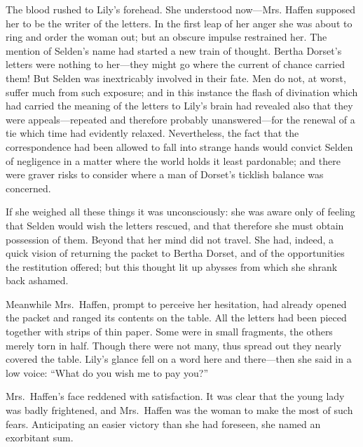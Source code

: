 \documentclass[12pt,a4paper]{book}
\begin{document}
The blood rushed to Lily's forehead. She understood now---Mrs.
Haffen supposed her to be the writer of the letters. In the first
leap of her anger she was about to ring and order the woman out;
but an obscure impulse restrained her. The mention of Selden's
name had started a new train of thought. Bertha Dorset's letters
were nothing to her---they might go where the current of chance
carried them! But Selden was inextricably involved in their fate. 
Men do not, at worst, suffer much from such exposure; and in this
instance the flash of divination which had carried the meaning of
the letters to Lily's brain had revealed also that they were
appeals---repeated and therefore probably unanswered---for the
renewal of a tie which time had evidently relaxed. Nevertheless,
the fact that the correspondence had been allowed to fall into
strange hands would convict Selden of negligence in a matter
where the world holds it least pardonable; and there were graver
risks to consider where a man of Dorset's ticklish balance was
concerned.





If she weighed all these things it was unconsciously: she was
aware only of feeling that Selden would wish the letters rescued,
and that therefore she must obtain possession of them. Beyond
that her mind did not travel. She had, indeed, a quick vision of
returning the packet to Bertha Dorset, and of the opportunities
the restitution offered; but this thought lit up abysses from
which she shrank back ashamed.





Meanwhile Mrs.\ Haffen, prompt to perceive her hesitation, had
already opened the packet and ranged its contents on the table. 
All the letters had been pieced together with strips of thin
paper. Some were in small fragments, the others merely torn in
half. Though there were not many, thus spread out they nearly
covered the table. Lily's glance fell on a word here and
there---then she said in a low voice: ``What do you wish me to pay
you?''





Mrs.\ Haffen's face reddened with satisfaction. It was clear that
the young lady was badly frightened, and Mrs.\ Haffen was the
woman to make the most of such fears. Anticipating an easier
victory than she had foreseen, she named an exorbitant sum.
\end{document}

